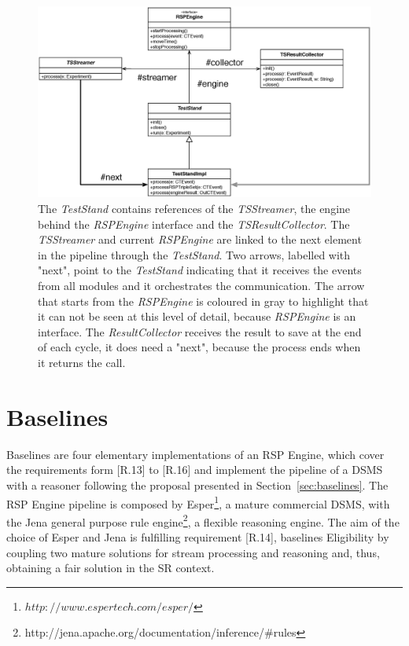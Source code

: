 \begin{figure}[p!]
  \centering
	\includegraphics[width=0.9\linewidth]{images/uml_teststand_modules}
	\caption[\name \textsc{TestStand} and Modules  - UML Schema] {The \textit{TestStand} contains references of the \textit{TSStreamer}, the engine behind the \textit{RSPEngine} interface and the \textit{TSResultCollector}. The \textit{TSStreamer} and current \textit{RSPEngine} are linked to the next element in the pipeline through the \textit{TestStand}. Two arrows, labelled with "next", point to the  \textit{TestStand} indicating that it receives the events from all modules and it orchestrates the communication. The arrow that starts from the \textit{RSPEngine} is coloured in gray to highlight that it can not be seen at this level of detail, because \textit{RSPEngine} is an interface. The \textit{ResultCollector} receives the result to save at the end of each cycle, it does need a "next", because the process ends when it returns the call.} 
  	\label{fig:uml_teststand_modules}
\end{figure}

\pagebreak

\section{Baselines}\label{sec:baselines-impl}

\name Baselines are four elementary implementations of an RSP Engine, which  cover the requirements form [R.13] to [R.16] and implement the pipeline of a DSMS with a reasoner following the proposal presented in Section~\ref{sec:baselines}. 
The RSP Engine pipeline is composed by Esper\footnote{$http://www.espertech.com/esper/$}, a mature commercial DSMS, with the Jena general purpose rule engine\footnote{http://jena.apache.org/documentation/inference/\#rules}, a flexible reasoning engine.  The aim of the choice of Esper and Jena is fulfilling requirement [R.14], baselines Eligibility by coupling two mature solutions for stream processing and reasoning and, thus, obtaining a fair solution in the SR context.

